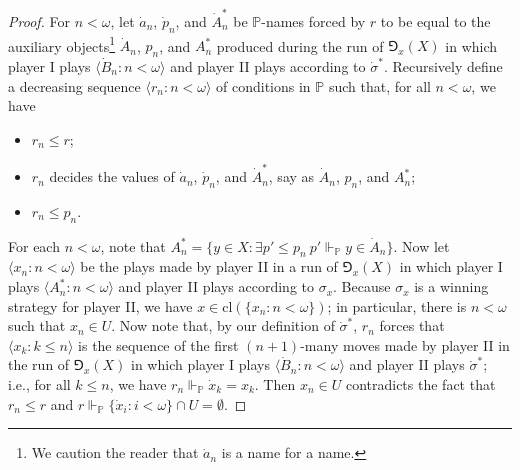 \documentclass[10pt,a4paper]{amsart}
\renewcommand{\P}{\bb{P}}
\newcommand{\bb}{\mathbb}
\begin{document}
\begin{proof}
  For $n < \omega$, let $\dot{a}_n$, $\dot{p}_n$, and $\dot{A}^*_n$ 
  be $\P$-names forced by $r$ to be equal 
  to the auxiliary objects\footnote{We caution the reader that $\dot a_n$ is a name for a name.} $\dot{A}_n$, $p_n$, and $A^*_n$ produced during the run of 
  $\Game_x(X)$ in which player I plays $\langle \dot{B}_n :n < \omega \rangle$ and 
  player II plays according to $\dot{\sigma}^*$. Recursively define a decreasing sequence 
  $\langle r_n :n < \omega \rangle$ of conditions in $\P$ such that, for all $n < \omega$, 
  we have
  \begin{itemize}
    \item $r_n \leq r$;
    \item $r_n$ decides the values of $\dot{a}_n$, $\dot{p}_n$, and $\dot{A}^*_n$, say as 
    $\dot{A}_n$, $p_n$, and $A^*_n$;
    \item $r_n \leq p_n$.
  \end{itemize}
  For each $n < \omega$, note that $A^*_n = \{y \in X :\exists p' \leq p_n \ p' \Vdash_{\P} 
  y \in \dot{A}_n \}$. Now let $\langle x_n :n < \omega \rangle$ be the plays made by player II 
  in a run of $\Game_x(X)$ in which player I plays $\langle A^*_n :n < \omega \rangle$ and 
  player II plays according to $\sigma_x$. Because $\sigma_x$ is a winning strategy for player II, 
  we have $x \in \mathrm{cl}(\{x_n :n < \omega\})$; in particular, there is $n < \omega$ 
  such that $x_n \in U$. Now note that, by our definition of $\dot{\sigma}^*$, $r_n$ forces that 
  $\langle x_k :k \leq n \rangle$ is the sequence of the first $(n+1)$-many moves made 
  by player II in the run of $\Game_x(X)$ in which player I plays $\langle \dot{B}_n :n < 
  \omega \rangle$ and player II plays $\dot{\sigma}^*$; i.e., for all $k \leq n$, we have 
  $r_n \Vdash_{\P} \dot{x}_k = x_k$. Then $x_n \in U$ contradicts the fact that 
  $r_n \leq r$ and $r \Vdash_{\P} \{\dot{x}_i :i < \omega\} \cap U = \emptyset$.
\end{proof}
\end{document}
